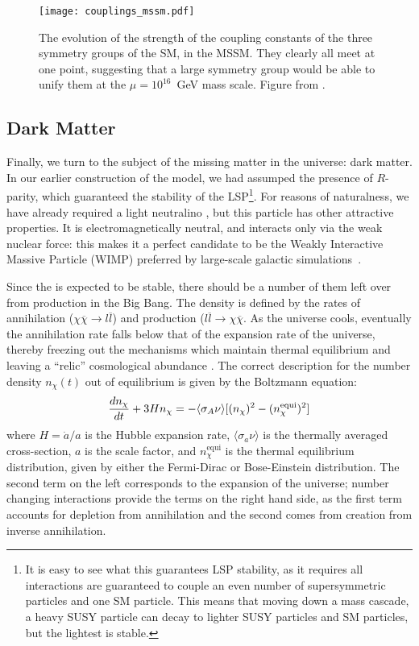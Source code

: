 
\begin{figure}
\centering
\texttt{[image: couplings\_mssm.pdf]}
\caption{The evolution of the strength of the coupling constants of the three symmetry groups of the SM, in the MSSM. They clearly all meet at one point, suggesting that a large symmetry group would be able to unify them at the $\mu = 10^{16}$~GeV mass scale. Figure from \cite{susypheno}.}
\label{fig:susy:couplings_mssm}
\end{figure}


\subsection{Dark Matter}

Finally, we turn to the subject of the missing matter in the universe: dark matter. In our earlier construction of the model, we had assumped the presence of $R$-parity, which guaranteed the stability of the LSP\footnote{It is easy to see what this guarantees LSP stability, as it requires all interactions are guaranteed to couple an even number of supersymmetric particles and one SM particle. This means that moving down a mass cascade, a heavy SUSY particle can decay to lighter SUSY particles and SM particles, but the lightest is stable.}. For reasons of naturalness, we have already required a light neutralino \lsp, but this particle has other attractive properties. It is electromagnetically neutral, and interacts only via the weak nuclear force: this makes it a perfect candidate to be the Weakly Interactive Massive Particle (WIMP) preferred by large-scale galactic simulations~\cite{Goldberg:1983nd,Ellis:1983ew,Jungman}.

Since the \lsp is expected to be stable, there should be a number of them left over from production in the Big Bang. The density is defined by the rates of annihilation ($\chi\overline{\chi} \rightarrow l \overline{l}$) and production ($l\overline{l}\rightarrow \chi\overline{\chi}$. As the universe cools, eventually the annihilation rate falls below that of the expansion rate of the universe, thereby freezing out the mechanisms which maintain thermal equilibrium and leaving a ``relic'' cosmological abundance \cite{Jungman}. The correct description for the number density $n_\chi(t)$ out of equilibrium is given by the Boltzmann equation:
\begin{align}
  \frac{d n_\chi}{d t} + 3 H n_\chi = - \langle \sigma_A \nu \rangle [(n_\chi)^2 - (n_\chi^\mathrm{equi})^2]\label{eqn:boltz}
\end{align}
where $H=\dot{a}/a$ is the Hubble expansion rate, $\langle\sigma_a \nu\rangle$ is the thermally averaged cross-section, $a$ is the scale factor, and $n_\chi^\mathrm{equi}$ is the thermal equilibrium distribution, given by either the Fermi-Dirac or Bose-Einstein distribution. The second term on the left corresponds to the expansion of the universe; number changing interactions provide the terms on the right hand side, as the first term accounts for depletion from annihilation and the second comes from creation from inverse annihilation. 


